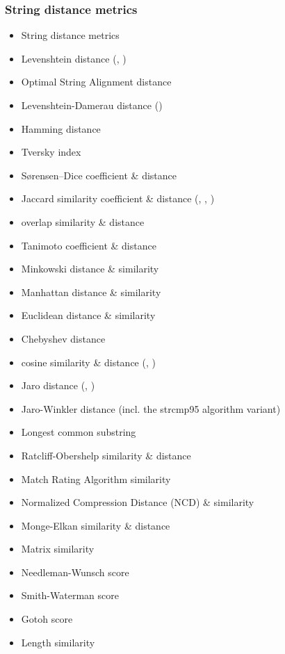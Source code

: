 \documentclass[12pt,a4paper]{article}
\begin{document}
	\subsubsection{String distance metrics}
	\begin{itemize}\itemsep-4pt
		\item String distance metrics
		\item {\color{red} Levenshtein distance}  (\cite{Levenshtein:1965}, \cite{Levenshtein:1966})
		\item Optimal String Alignment distance
		\item {\color{red} Levenshtein-Damerau distance} (\cite{Damerau:1964})
		\item Hamming distance
		\item Tversky index
		\item Sørensen–Dice coefficient \& distance
		\item {\color{red} Jaccard similarity coefficient \& distance} (\cite{Jaccard:1901}, \cite{Tanimoto:1958}, \cite{Tversky:1977})
		\item overlap similarity \& distance
		\item Tanimoto coefficient \& distance
		\item Minkowski distance \& similarity
		\item Manhattan distance \& similarity
		\item Euclidean distance \& similarity
		\item Chebyshev distance
		\item {\color{red} cosine similarity \& distance} (\cite{Otsuka:1936}, \cite{Ochiai:1957})
		\item {\color{red} Jaro distance} (\cite{Jaro:1989}, \cite{Winkler:1990})
		\item {\color{red} Jaro-Winkler distance (incl. the strcmp95 algorithm variant)}
		\item Longest common substring
		\item Ratcliff-Obershelp similarity \& distance
		\item Match Rating Algorithm similarity
		\item Normalized Compression Distance (NCD) \& similarity
		\item Monge-Elkan similarity \& distance
		\item Matrix similarity
		\item Needleman-Wunsch score
		\item Smith-Waterman score
		\item Gotoh score
		\item Length similarity

\end{itemize}
\end{document}
